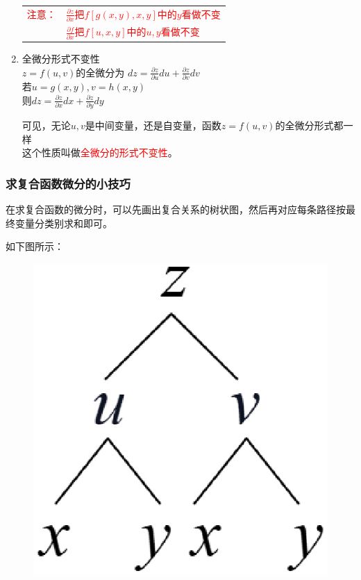 \documentclass{article} %
\begin{document}
\begin{enumerate}
        \textcolor{red}{
        \begin{tabular}{ll}
            注意： & $\frac{\partial z}{\partial x}$把$f[g(x,y),x,y]$中的$y$看做不变\\
                     & $\frac{\partial f}{\partial x}$把$f[u,x,y]$中的$u,y$看做不变\\
        \end{tabular}
        }
    \item 全微分形式不变性 \vspace{1mm}\\
        $z=f(u,v)$的全微分为
        $\displaystyle dz=\frac{\partial z}{\partial u}du+\frac{\partial z}{\partial v}dv$\\
        若$u=g(x,y),v=h(x,y)$\\
        则$\displaystyle dz=\frac{\partial z}{\partial x}dx+\frac{\partial z}{\partial y}dy$\\
        \vspace{1mm}

        可见，无论$u,v$是中间变量，还是自变量，函数$z=f(u,v)$的全微分形式都一样\\这个性质叫做\textcolor{red}{全微分的形式不变性}。
\end{enumerate}

\subsubsection{求复合函数微分的小技巧}
在求复合函数的微分时，可以先画出复合关系的树状图，然后再对应每条路径按最终变量分类别求和即可。\par
如下图所示：

\begin{figure}[htbp]
    \centering
    \includegraphics[scale=0.3]{p9-2.eps}
    \label{figure}
\end{figure}
\end{document}
